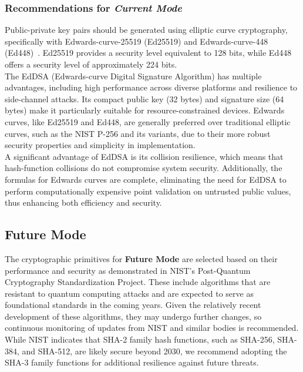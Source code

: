\documentclass[pdflatex,sn-mathphys-num]{sn-jnl}%
\theoremstyle{thmstyleone}%
\theoremstyle{thmstyletwo}%
\theoremstyle{thmstylethree}%
\begin{document}
\subsubsection{Recommendations for \emph{Current Mode}}

Public-private key pairs should be generated using elliptic curve cryptography, specifically with Edwards-curve-25519 (Ed25519) and Edwards-curve-448 (Ed448)~\cite{rfc8032}. Ed25519 provides a security level equivalent to 128 bits, while Ed448 offers a security level of approximately 224 bits.\\

The EdDSA (Edwards-curve Digital Signature Algorithm) has multiple advantages, including high performance across diverse platforms and resilience to side-channel attacks. Its compact public key (32 bytes) and signature size (64 bytes) make it particularly suitable for resource-constrained devices. Edwards curves, like Ed25519 and Ed448, are generally preferred over traditional elliptic curves, such as the NIST P-256 and its variants, due to their more robust security properties and simplicity in implementation.\\

A significant advantage of EdDSA is its collision resilience, which means that hash-function collisions do not compromise system security. Additionally, the formulas for Edwards curves are complete, eliminating the need for EdDSA to perform computationally expensive point validation on untrusted public values, thus enhancing both efficiency and security.

\subsection{Future Mode }

The cryptographic primitives for \textbf{Future Mode} are selected based on their performance and security as demonstrated in NIST’s Post-Quantum Cryptography Standardization Project. These include algorithms that are resistant to quantum computing attacks and are expected to serve as foundational standards in the coming years. Given the relatively recent development of these algorithms, they may undergo further changes, so continuous monitoring of updates from NIST and similar bodies is recommended.\\

While NIST indicates that SHA-2 family hash functions, such as SHA-256, SHA-384, and SHA-512, are likely secure beyond 2030, we recommend adopting the SHA-3 family functions for additional resilience against future threats.
\end{document}
